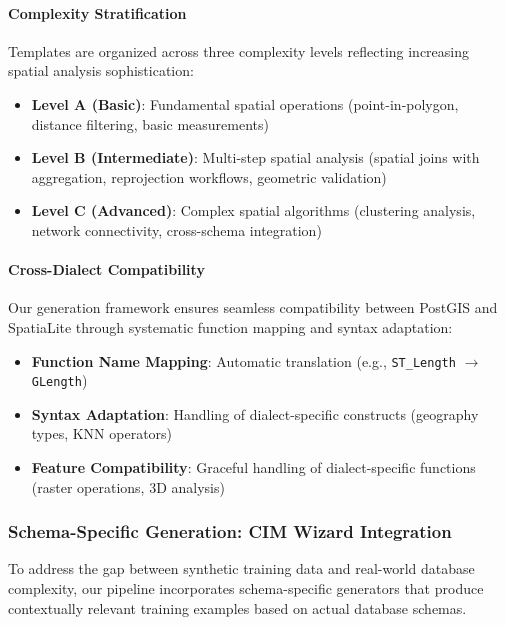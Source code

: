 \paragraph{Complexity Stratification}
Templates are organized across three complexity levels reflecting increasing spatial analysis sophistication:
\begin{itemize}
    \item \textbf{Level A (Basic)}: Fundamental spatial operations (point-in-polygon, distance filtering, basic measurements)
    \item \textbf{Level B (Intermediate)}: Multi-step spatial analysis (spatial joins with aggregation, reprojection workflows, geometric validation)
    \item \textbf{Level C (Advanced)}: Complex spatial algorithms (clustering analysis, network connectivity, cross-schema integration)
\end{itemize}

\paragraph{Cross-Dialect Compatibility}
Our generation framework ensures seamless compatibility between PostGIS and SpatiaLite through systematic function mapping and syntax adaptation:
\begin{itemize}
    \item \textbf{Function Name Mapping}: Automatic translation (e.g., \texttt{ST\_Length} $\rightarrow$ \texttt{GLength})
    \item \textbf{Syntax Adaptation}: Handling of dialect-specific constructs (geography types, KNN operators)
    \item \textbf{Feature Compatibility}: Graceful handling of dialect-specific functions (raster operations, 3D analysis)
\end{itemize}

\subsubsection{Schema-Specific Generation: CIM Wizard Integration}
\label{subsubsec:schema-specific}

To address the gap between synthetic training data and real-world database complexity, our pipeline incorporates schema-specific generators that produce contextually relevant training examples based on actual database schemas.

